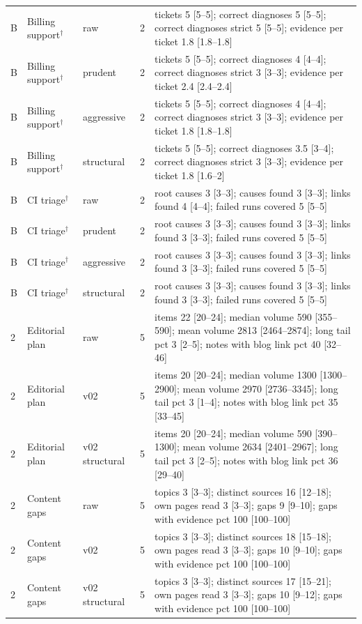 \begin{longtable}{lllrp{8.0cm}}
B & Billing support$^\dagger$ & raw & 2 & tickets 5 [5--5]; correct diagnoses 5 [5--5]; correct diagnoses strict 5 [5--5]; evidence per ticket 1.8 [1.8--1.8] \\
B & Billing support$^\dagger$ & prudent & 2 & tickets 5 [5--5]; correct diagnoses 4 [4--4]; correct diagnoses strict 3 [3--3]; evidence per ticket 2.4 [2.4--2.4] \\
B & Billing support$^\dagger$ & aggressive & 2 & tickets 5 [5--5]; correct diagnoses 4 [4--4]; correct diagnoses strict 3 [3--3]; evidence per ticket 1.8 [1.8--1.8] \\
B & Billing support$^\dagger$ & structural & 2 & tickets 5 [5--5]; correct diagnoses 3.5 [3--4]; correct diagnoses strict 3 [3--3]; evidence per ticket 1.8 [1.6--2] \\
B & CI triage$^\dagger$ & raw & 2 & root causes 3 [3--3]; causes found 3 [3--3]; links found 4 [4--4]; failed runs covered 5 [5--5] \\
B & CI triage$^\dagger$ & prudent & 2 & root causes 3 [3--3]; causes found 3 [3--3]; links found 3 [3--3]; failed runs covered 5 [5--5] \\
B & CI triage$^\dagger$ & aggressive & 2 & root causes 3 [3--3]; causes found 3 [3--3]; links found 3 [3--3]; failed runs covered 5 [5--5] \\
B & CI triage$^\dagger$ & structural & 2 & root causes 3 [3--3]; causes found 3 [3--3]; links found 3 [3--3]; failed runs covered 5 [5--5] \\
2 & Editorial plan & raw & 5 & items 22 [20--24]; median volume 590 [355--590]; mean volume 2813 [2464--2874]; long tail pct 3 [2--5]; notes with blog link pct 40 [32--46] \\
2 & Editorial plan & v02 & 5 & items 20 [20--24]; median volume 1300 [1300--2900]; mean volume 2970 [2736--3345]; long tail pct 3 [1--4]; notes with blog link pct 35 [33--45] \\
2 & Editorial plan & v02 structural & 5 & items 20 [20--24]; median volume 590 [390--1300]; mean volume 2634 [2401--2967]; long tail pct 3 [2--5]; notes with blog link pct 36 [29--40] \\
2 & Content gaps & raw & 5 & topics 3 [3--3]; distinct sources 16 [12--18]; own pages read 3 [3--3]; gaps 9 [9--10]; gaps with evidence pct 100 [100--100] \\
2 & Content gaps & v02 & 5 & topics 3 [3--3]; distinct sources 18 [15--18]; own pages read 3 [3--3]; gaps 10 [9--10]; gaps with evidence pct 100 [100--100] \\
2 & Content gaps & v02 structural & 5 & topics 3 [3--3]; distinct sources 17 [15--21]; own pages read 3 [3--3]; gaps 10 [9--12]; gaps with evidence pct 100 [100--100] \\

\end{longtable}

